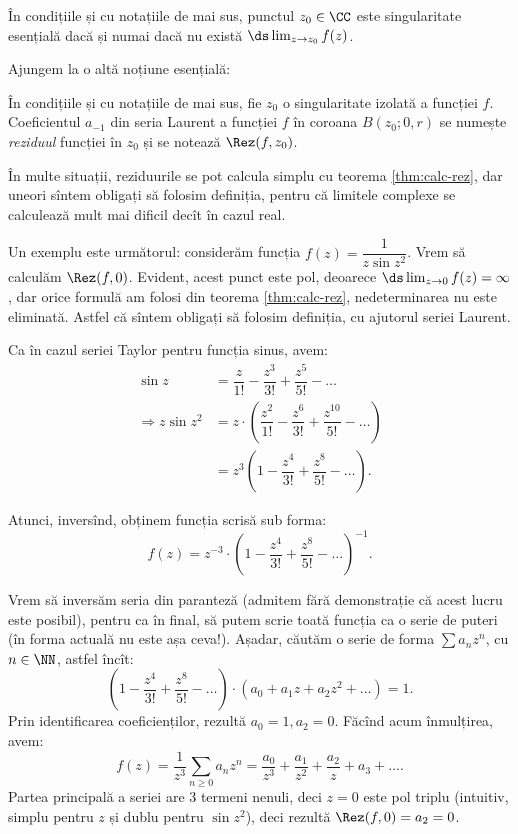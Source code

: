 \begin{proposition}\label{pr:sing-es}
  În condițiile și cu notațiile de mai sus, punctul $ z_0 \in \CC $ este
  singularitate esențială dacă și numai dacă nu există
  $ \ds\lim_{z \to z_0} f(z) $.
\end{proposition}

Ajungem la o altă noțiune esențială:
\begin{definition}
  În condițiile și cu notațiile de mai sus, fie $ z_0 $ o singularitate
  izolată a funcției $ f $. Coeficientul $ a_{-1} $ din seria Laurent
  a funcției $ f $ în coroana $ B(z_0; 0, r) $ se numește
  \emph{reziduul} funcției în $ z_0 $ și se notează $ \Rez(f,z_0) $.
\end{definition}

\begin{remark}\label{rk:calcul-rez}
  În multe situații, reziduurile se pot calcula simplu cu teorema \ref{thm:calc-rez},
  dar uneori sîntem obligați să folosim definiția, pentru că limitele complexe
  se calculează mult mai dificil decît în cazul real.
\end{remark}

Un exemplu este următorul: considerăm funcția $ f(z) = \dfrac{1}{z \sin z^2} $.
Vrem să calculăm $ \Rez(f, 0) $. Evident, acest punct este pol, deoarece
$ \ds\lim_{z \to 0} f(z) = \infty $, dar orice formulă am folosi din
teorema \ref{thm:calc-rez}, nedeterminarea nu este eliminată. Astfel că sîntem
obligați să folosim definiția, cu ajutorul seriei Laurent.

Ca în cazul seriei Taylor pentru funcția sinus, avem:
\begin{align*}
  \sin z &= \dfrac{z}{1!} - \dfrac{z^3}{3!} + \dfrac{z^5}{5!} - \dots \\
  \Rightarrow z \sin z^2 &= z \cdot \left( \dfrac{z^2}{1!} - \dfrac{z^6}{3!} + \dfrac{z^{10}}{5!} - \dots \right) \\
         &= z^3 \left( 1 - \dfrac{z^4}{3!} + \dfrac{z^8}{5!} - \dots \right).
\end{align*}

Atunci, inversînd, obținem funcția scrisă sub forma:
\[
  f(z) = z^{-3} \cdot \left( 1 - \dfrac{z^4}{3!} + \dfrac{z^8}{5!} - \dots \right)^{-1}.
\]

Vrem să inversăm seria din paranteză (admitem fără demonstrație că acest lucru
este posibil), pentru ca în final, să putem scrie toată funcția ca o serie de
puteri (în forma actuală nu este așa ceva!). Așadar, căutăm o serie de forma
$ \sum a_n z^n $, cu $ n \in \NN $, astfel încît:
\[
  \left( 1 - \dfrac{z^4}{3!} + \dfrac{z^8}{5!} - \dots \right) \cdot %
  \left(a_0 + a_1 z + a_2 z^2 + \dots \right) = 1.
\]
Prin identificarea coeficienților, rezultă $ a_0 = 1, a_2 = 0 $. Făcînd acum
înmulțirea, avem:
\[
  f(z) = \dfrac{1}{z^3} \sum_{n \geq 0} a_n z^n = %
  \dfrac{a_0}{z^3} + \dfrac{a_1}{z^2} + \dfrac{a_2}{z} + a_3 + \dots.
\]
Partea principală a seriei are 3 termeni nenuli, deci $ z = 0 $ este pol triplu
(intuitiv, simplu pentru $ z $ și dublu pentru $ \sin z^2 $), deci rezultă
$ \Rez(f, 0) = a_2 = 0 $.

